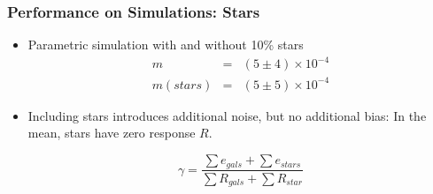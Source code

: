 \documentclass{beamer}
\begin{document}
\frame
{
    \frametitle{Performance on Simulations: Stars}

 
    \begin{itemize}

        \item Parametric simulation with and without {\color{gold} 10\% stars}
             {\color{lightskyblue} 
                 \begin{eqnarray}
                     m        & = & (5 \pm 4) \times 10^{-4} \nonumber \\
                     m(stars) & = & (5 \pm 5) \times 10^{-4} \nonumber
                 \end{eqnarray}
             }

         \item Including stars introduces additional noise, but no
             additional bias: In the mean, stars have zero response {\color{gold} $R$}.

             {\color{mygray} 
                 \begin{equation}
                     \gamma = \frac{\sum e_{gals} + \sum e_{stars}}{\sum R_{gals} + \sum R_{star}} \nonumber
                 \end{equation}
             }


    \end{itemize}

}
\end{document}
